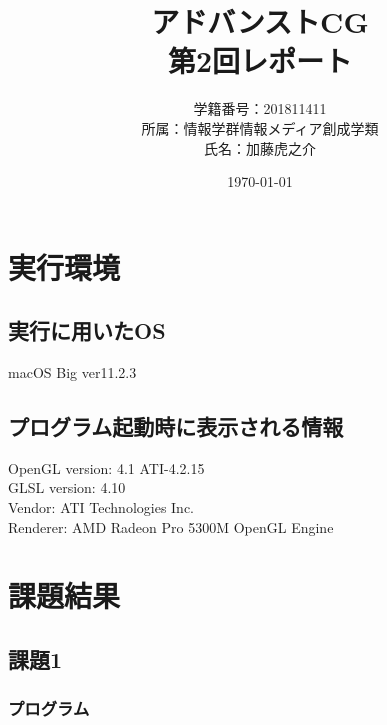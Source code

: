 \documentclass[a4paper,10pt,uplatex,dvipdfmx]{jsarticle}
\begin{document}
\title{アドバンストCG\\ \huge 第2回レポート}
\author{学籍番号：201811411\\ 所属：情報学群情報メディア創成学類\\ 氏名：加藤虎之介}
\date{\today}
\maketitle

\section{実行環境}
\subsection{実行に用いたOS}
macOS Big ver11.2.3

\subsection{プログラム起動時に表示される情報}
\begin{screen}
  OpenGL version: 4.1 ATI-4.2.15\\
  GLSL version: 4.10\\
  Vendor: ATI Technologies Inc.\\
  Renderer: AMD Radeon Pro 5300M OpenGL Engine
\end{screen}

\section{課題結果}
\subsection*{課題1}
\subsubsection*{プログラム}




\end{document}
